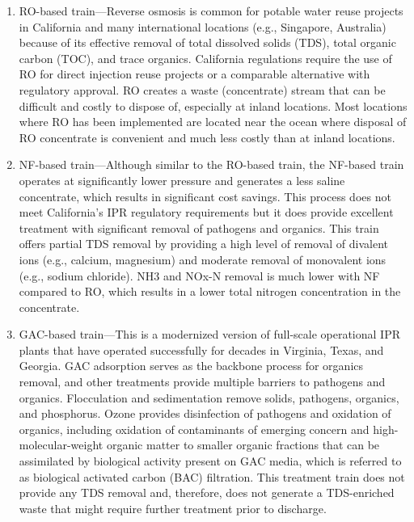\documentclass{article}
\begin{document}
\begin{enumerate}
\def\labelenumi{\arabic{enumi}.}
\tightlist
\item
  RO-based train---Reverse osmosis is common for potable water reuse
  projects in California and many international locations (e.g.,
  Singapore, Australia) because of its effective removal of total
  dissolved solids (TDS), total organic carbon (TOC), and trace
  organics. California regulations require the use of RO for direct
  injection reuse projects or a comparable alternative with regulatory
  approval. RO creates a waste (concentrate) stream that can be
  difficult and costly to dispose of, especially at inland locations.
  Most locations where RO has been implemented are located near the
  ocean where disposal of RO concentrate is convenient and much less
  costly than at inland locations.
\item
  NF-based train---Although similar to the RO-based train, the NF-based
  train operates at significantly lower pressure and generates a less
  saline concentrate, which results in significant cost savings. This
  process does not meet California's IPR regulatory requirements but it
  does provide excellent treatment with significant removal of pathogens
  and organics. This train offers partial TDS removal by providing a
  high level of removal of divalent ions (e.g., calcium, magnesium) and
  moderate removal of monovalent ions (e.g., sodium chloride). NH3 and
  NOx-N removal is much lower with NF compared to RO, which results in a
  lower total nitrogen concentration in the concentrate.
\item
  GAC-based train---This is a modernized version of full-scale
  operational IPR plants that have operated successfully for decades in
  Virginia, Texas, and Georgia. GAC adsorption serves as the backbone
  process for organics removal, and other treatments provide multiple
  barriers to pathogens and organics. Flocculation and sedimentation
  remove solids, pathogens, organics, and phosphorus. Ozone provides
  disinfection of pathogens and oxidation of organics, including
  oxidation of contaminants of emerging concern and
  high-molecular-weight organic matter to smaller organic fractions that
  can be assimilated by biological activity present on GAC media, which
  is referred to as biological activated carbon (BAC) filtration. This
  treatment train does not provide any TDS removal and, therefore, does
  not generate a TDS-enriched waste that might require further treatment
  prior to discharge.
\end{enumerate}
\end{document}
